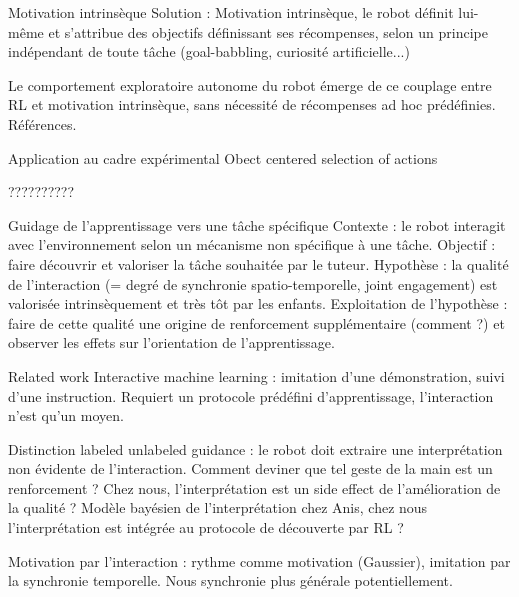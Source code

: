 \documentclass[xcolor=pst,dvips,12pt,english,french]{beamer}
\begin{document}
	\begin{frame}{Motivation intrinsèque}
		Solution : Motivation intrinsèque, le robot définit lui-même et s'attribue des objectifs définissant ses récompenses, selon un principe indépendant de toute tâche (goal-babbling, curiosité artificielle...)
		
		Le comportement exploratoire autonome du robot émerge de ce couplage entre RL et motivation intrinsèque, sans nécessité de récompenses ad hoc prédéfinies.
		Références.
	\end{frame}
	
	\begin{frame}{Application au cadre expérimental}
		Obect centered selection of actions
		
		??????????
	\end{frame}
	
	\begin{frame}{Guidage de l'apprentissage vers une tâche spécifique}
		Contexte : le robot interagit avec l'environnement selon un mécanisme non spécifique à une tâche.
		Objectif : faire découvrir et valoriser la tâche souhaitée par le tuteur.
		Hypothèse : la qualité de l'interaction (= degré de synchronie spatio-temporelle, joint engagement) est valorisée intrinsèquement et très tôt par les enfants. 
		Exploitation de l'hypothèse : faire de cette qualité une origine de renforcement supplémentaire (comment ?) et observer les effets sur l'orientation de l'apprentissage.
	\end{frame}
	
	\begin{frame}{Related work}
		Interactive machine learning : imitation d'une démonstration, suivi d'une instruction. Requiert un protocole prédéfini d'apprentissage, l'interaction n'est qu'un moyen.
		
		Distinction labeled unlabeled guidance : le robot doit extraire une interprétation non évidente de l'interaction. Comment deviner que tel geste de la main est un renforcement ? Chez nous, l'interprétation est un side effect de l'amélioration de la qualité ? Modèle bayésien de l'interprétation chez Anis, chez nous l'interprétation est intégrée au protocole de découverte par RL ?
		
		Motivation par l'interaction : rythme comme motivation (Gaussier), imitation par la synchronie temporelle. Nous synchronie plus générale potentiellement.
	\end{frame}
	
\end{document}
